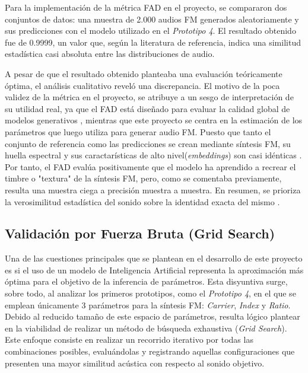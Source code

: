 \documentclass[12pt, a4paper]{article}
\begin{document}
Para la implementación de la métrica FAD en el proyecto, se compararon dos conjuntos de datos: una muestra de 2.000 audios FM generados aleatoriamente
y sus predicciones con el modelo utilizado en el \textit{Prototipo 4}. El resultado obtenido fue de 0.9999, un valor que, según la literatura de referencia, indica una similitud estadística casi absoluta entre las distribuciones de audio.


A pesar de que el resultado obtenido planteaba una evaluación teóricamente óptima, el análisis cualitativo reveló una discrepancia. 
El motivo de la poca validez de la métrica en el proyecto, se atribuye a un sesgo de interpretación de su 
utilidad real, ya que el FAD está diseñado para evaluar la calidad global de modelos generativos \cite{kilgour2019}, mientras que este proyecto se centra 
en la estimación de los parámetros que luego utiliza para generar audio FM. 
Puesto que tanto el conjunto de referencia como las predicciones se crean mediante síntesis FM, su huella espectral y sus caractarísticas de alto nivel(\textit{embeddings})
son casi idénticas \cite{kilgour2019}. Por tanto, el FAD evalúa positivamente que el modelo ha aprendido a recrear el timbre o "textura" de 
la síntesis FM, pero, como se comentaba previamente, resulta una muestra ciega a precisión muestra a muestra. En resumen, se prioriza la 
verosimilitud estadística del sonido sobre la identidad exacta del mismo \cite{kilgour2019, agostinelli2023}.


\subsection{Validación por Fuerza Bruta (Grid Search)}
Una de las cuestiones principales que se plantean en el desarrollo de este proyecto es si el uso de un modelo de Inteligencia Artificial representa
la aproximación más óptima para el objetivo de la inferencia de parámetros. Esta disyuntiva surge, sobre todo, al analizar los primeros prototipos, 
como el \textit{Prototipo 4}, en el que se emplean únicamente 3 parámetros para la síntesis FM: \textit{Carrier}, \textit{Index} y \textit{Ratio}.
Debido al reducido tamaño de este espacio de parámetros, resulta lógico plantear en la viabilidad de realizar un método de búsqueda exhaustiva 
(\textit{Grid Search}). Este enfoque consiste en realizar un recorrido iterativo por todas las combinaciones posibles, evaluándolas y registrando 
aquellas configuraciones que presenten una mayor similitud acústica con
respecto al sonido objetivo.
\end{document}
